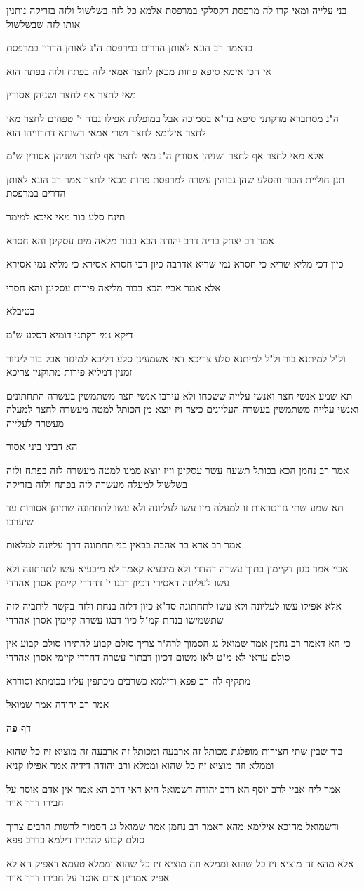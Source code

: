 \documentclass[12pt, openany]{book}
\newcommand{\sethebfont}{
\fontsize{10.5pt}{21.0pt} \selectfont
}
\newcommand{\textblock}[1]{
{\sethebfont #1\\}	
}
\newcommand{\sectname}{}
\newcommand{\newsection}[1]{
	\addcontentsline{toc}{section}{#1}
	\renewcommand{\sectname}{#1}	
	\vspace{-\baselineskip}
	\begin{center}
		\textbf{%
\fontsize{16pt}{16pt}\selectfont
			#1}
	\end{center}
	\vspace{-\baselineskip}
	\nopagebreak
}
\begin{document}
\textblock{בני עלייה ומאי קרו לה מרפסת דקסלקי במרפסת אלמא כל לזה בשלשול ולזה בזריקה נותנין אותו לזה שבשלשול}
\textblock{כדאמר רב הונא לאותן הדרים במרפסת ה"נ לאותן הדרין במרפסת}
\textblock{אי הכי אימא סיפא פחות מכאן לחצר אמאי לזה בפתח ולזה בפתח הוא}
\textblock{מאי לחצר אף לחצר ושניהן אסורין}
\textblock{ה"נ מסתברא מדקתני סיפא בד"א בסמוכה אבל במופלגת אפילו גבוה י' טפחים לחצר מאי לחצר אילימא לחצר ושרי אמאי רשותא דתרוייהו הוא}
\textblock{אלא מאי לחצר אף לחצר ושניהן אסורין ה"נ מאי לחצר אף לחצר ושניהן אסורין ש"מ}
\textblock{תנן חוליית הבור והסלע שהן גבוהין עשרה למרפסת פחות מכאן לחצר אמר רב הונא לאותן הדרים במרפסת}
\textblock{תינח סלע בור מאי איכא למימר}
\textblock{אמר רב יצחק בריה דרב יהודה הכא בבור מלאה מים עסקינן והא חסרא}
\textblock{כיון דכי מליא שריא כי חסרא נמי שריא אדרבה כיון דכי חסרא אסירא כי מליא נמי אסירא}
\textblock{אלא אמר אביי הכא בבור מליאה פירות עסקינן והא חסרי}
\textblock{בטיבלא}
\textblock{דיקא נמי דקתני דומיא דסלע ש"מ}
\textblock{ול"ל למיתנא בור ול"ל למיתנא סלע צריכא דאי אשמעינן סלע דליכא למיגזר אבל בור ליגזור זמנין דמליא פירות מתוקנין צריכא}
\textblock{תא שמע אנשי חצר ואנשי עלייה ששכחו ולא עירבו אנשי חצר משתמשין בעשרה התחתונים ואנשי עלייה משתמשין בעשרה העליונים כיצד זיז יוצא מן הכותל למטה מעשרה לחצר למעלה מעשרה לעלייה}
\textblock{הא דביני ביני אסור}
\textblock{אמר רב נחמן הכא בכותל תשעה עשר עסקינן וזיז יוצא ממנו למטה מעשרה לזה בפתח ולזה בשלשול למעלה מעשרה לזה בפתח ולזה בזריקה}
\textblock{תא שמע שתי גזוזטראות זו למעלה מזו עשו לעליונה ולא עשו לתחתונה שתיהן אסורות עד שיערבו}
\textblock{אמר רב אדא בר אהבה בבאין בני תחתונה דרך עליונה למלאות}
\textblock{אביי אמר כגון דקיימין בתוך עשרה דהדדי ולא מיבעיא קאמר לא מיבעיא עשו לתחתונה ולא עשו לעליונה דאסירי דכיון דבגו י' דהדדי קיימין אסרן אהדדי}
\textblock{אלא אפילו עשו לעליונה ולא עשו לתחתונה סד"א כיון דלזה בנחת ולזה בקשה ליתביה לזה שתשמישו בנחת קמ"ל כיון דבגו עשרה קיימין אסרן אהדדי}
\textblock{כי הא דאמר רב נחמן אמר שמואל גג הסמוך לרה"ר צריך סולם קבוע להתירו סולם קבוע אין סולם עראי לא מ"ט לאו משום דכיון דבתוך עשרה דהדדי קיימי אסרן אהדדי}
\textblock{מתקיף לה רב פפא ודילמא כשרבים מכתפין עליו בכומתא וסודרא}
\textblock{אמר רב יהודה אמר שמואל}
\newsection{דף פה}
\textblock{בור שבין שתי חצירות מופלגת מכותל זה ארבעה ומכותל זה ארבעה זה מוציא זיז כל שהוא וממלא וזה מוציא זיז כל שהוא וממלא ורב יהודה דידיה אמר אפילו קניא}
\textblock{אמר ליה אביי לרב יוסף הא דרב יהודה דשמואל היא דאי דרב הא אמר אין אדם אוסר על חבירו דרך אויר}
\textblock{ודשמואל מהיכא אילימא מהא דאמר רב נחמן אמר שמואל גג הסמוך לרשות הרבים צריך סולם קבוע להתירו דילמא כדרב פפא}
\textblock{אלא מהא זה מוציא זיז כל שהוא וממלא וזה מוציא זיז כל שהוא וממלא טעמא דאפיק הא לא אפיק אמרינן אדם אוסר על חבירו דרך אויר}
\end{document}

